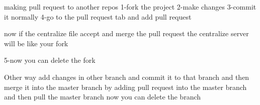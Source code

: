 making pull request to another repos
  1-fork the project   
  2-make changes 
  3-commit it normally 
  4-go to the pull request tab and add pull request 

  now if the centralize file accept and merge the pull request 
  the centralize server will be like your fork 

  5-now you can delete the fork

  Other way
  add changes in other branch 
  and commit it to that branch 
  and then merge it into the master branch
  by adding pull request into the master branch  
  and then pull the master branch 
  now you can delete the branch 